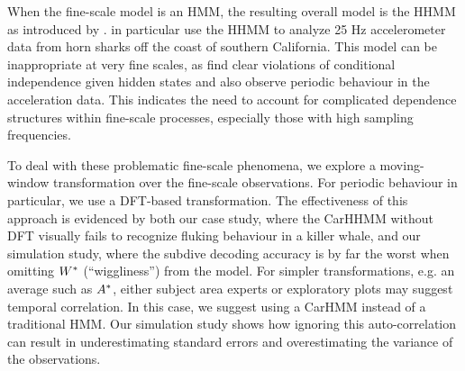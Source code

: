 When the fine-scale model is  an HMM, the resulting overall model is the HHMM as introduced by \citet{Barajas:2017}. \citet{Adam:2019} in particular use the HHMM to analyze 25 Hz accelerometer data from horn sharks off the coast of southern California. This model can be inappropriate at very fine scales, as \citet{Adam:2019} find clear violations of conditional independence given hidden states and also observe periodic behaviour in the acceleration data. This indicates the need to account for complicated dependence structures within fine-scale processes, especially those with high sampling frequencies. 




To deal with these problematic fine-scale phenomena, we explore a moving-window transformation over the fine-scale observations. For periodic behaviour in particular, we use a DFT-based transformation. The effectiveness of this approach is evidenced by both our case study, where the CarHHMM without DFT visually fails to recognize fluking behaviour in a killer whale, and our simulation study, where the subdive decoding accuracy is by far the worst when omitting $W^*$ (``wiggliness'') from the model. For simpler transformations, e.g. an average such as $A^*$, either subject area experts or exploratory plots may suggest temporal correlation. In this case,  we suggest using a CarHMM instead of a traditional HMM. Our simulation study shows how ignoring this auto-correlation can result in underestimating standard errors and overestimating the variance of the observations. 

